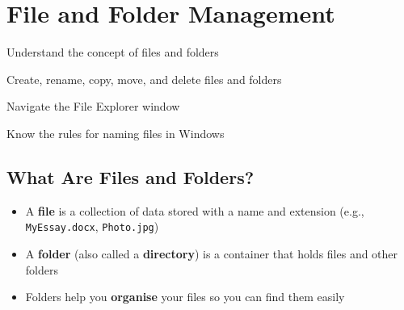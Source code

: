 
\chapter{File and Folder Management}
\label{ch:files}

\begin{objectives}
  \item Understand the concept of files and folders
  \item Create, rename, copy, move, and delete files and folders
  \item Navigate the File Explorer window
  \item Know the rules for naming files in Windows
\end{objectives}


\section{What Are Files and Folders?}
\label{sec:files-folders}

\begin{theorybox}
\begin{itemize}[leftmargin=*, label={\textcolor{ModuleBlue}{\faAngleRight}}, itemsep=4pt]
  \item A \textbf{file} is a collection of data stored with a name and extension (e.g., \texttt{MyEssay.docx}, \texttt{Photo.jpg})
  \item A \textbf{folder} (also called a \textbf{directory}) is a container that holds files and other folders
  \item Folders help you \textbf{organise} your files so you can find them easily
\end{itemize}
\end{theorybox}

